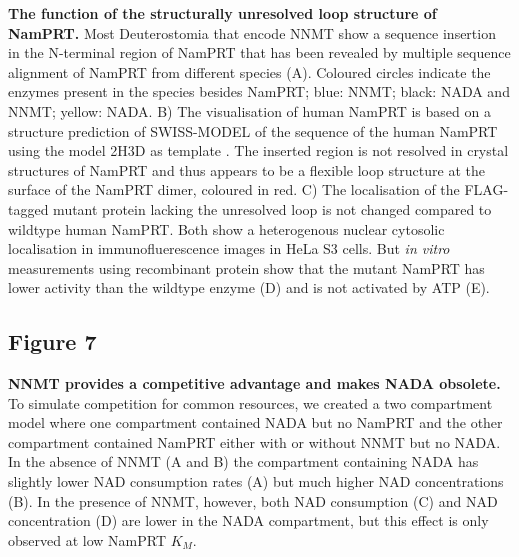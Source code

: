 \textbf{The function of the structurally unresolved loop structure of NamPRT.} Most Deuterostomia that encode NNMT show a sequence insertion in the N-terminal region of NamPRT that has been revealed by multiple sequence alignment of NamPRT from different species (A). Coloured circles indicate the enzymes present in the species besides NamPRT; blue: NNMT; black: NADA and NNMT; yellow: NADA. B) The visualisation of human NamPRT is based on a structure prediction of SWISS-MODEL \cite{Arnold2006,Biasini2014} of the sequence of the human NamPRT using the model 2H3D as template \cite{Wang2006}. The inserted region is not resolved in crystal structures of NamPRT and thus appears to be a flexible loop structure at the surface of the NamPRT dimer, coloured in red. C) The localisation of the FLAG-tagged mutant protein lacking the unresolved loop is not changed compared to wildtype human NamPRT. Both show a heterogenous nuclear cytosolic localisation in immunofluerescence images in HeLa S3 cells. But \textit{in vitro} measurements using recombinant protein show that the mutant NamPRT has lower activity than the wildtype enzyme (D) and is not activated by ATP (E).


\subsection{Figure 7}

\textbf{NNMT provides a competitive advantage and makes NADA obsolete.} To simulate competition for common resources, we created a two compartment model where one compartment contained NADA but no NamPRT and the other compartment contained NamPRT either with or without NNMT but no NADA. In the absence of NNMT (A and B) the compartment containing NADA has slightly lower NAD consumption rates (A) but much higher NAD concentrations (B). In the presence of NNMT, however, both NAD consumption (C) and NAD concentration (D) are lower in the NADA compartment, but this effect is only observed at low NamPRT $K_M$.
